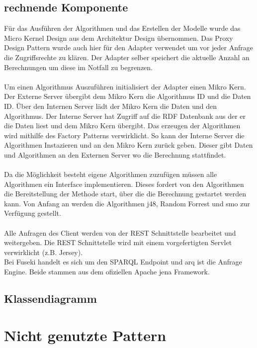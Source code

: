 \documentclass{book}
\begin{document}
\section{rechnende Komponente}
Für das Ausführen der Algorithmen und das Erstellen der Modelle wurde das Micro Kernel Design aus dem Architektur Design übernommen. Das Proxy Design Pattern wurde auch hier für den Adapter verwendet um vor jeder Anfrage die Zugriffsrechte zu klären. Der Adapter selber speichert die aktuelle Anzahl an Berechnungen um diese im Notfall zu begrenzen. \\
\\
Um einen Algorithmus Auszuführen initialisiert der Adapter einen Mikro Kern. Der Externe Server übergibt dem Mikro Kern die Algorithmus ID und die Daten ID. Über den Internen Server lädt der Mikro Kern die Daten und den Algorithmus. Der Interne Server hat Zugriff auf die RDF Datenbank aus der er die Daten liest und dem Mikro Kern übergibt. Das erzeugen der Algorithmen wird mithilfe des Factory Patterns verwirklicht. So kann der Interne Server die Algorithmen Instazieren und an den Mikro Kern zurück geben. Dieser gibt Daten und Algorithmen an den Externen Server wo die Berechnung stattfindet.\\
\\
Da die Möglichkeit besteht eigene Algorithmen zuzufügen müssen alle Algorithmen ein Interface implementieren.
Dieses fordert von den Algorithmen die Bereitstellung der Methode start, über die die Berechnung gestartet werden kann. Von Anfang an werden die Algorithmen j48, Random Forrest und smo zur Verfügung gestellt. \\
\\
Alle Anfragen des Client werden von der REST Schnittstelle bearbeitet und weitergeben. Die REST Schnittstelle wird mit einem vorgefertigten Servlet verwirklicht (z.B. Jersey).\\
Bei Fuseki handelt es sich um den SPARQL Endpoint und arq ist die Anfrage Engine. Beide stammen aus dem ofiziellen Apache jena Framework.

\section{Klassendiagramm} 


\chapter{Nicht genutzte Pattern}
 
\end{document}
